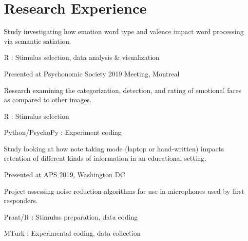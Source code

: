 \documentclass[letterpaper]{deedy-resume_sm} %
\begin{document}
\section{Research Experience}
\begin{tightitemize}
\item Study investigating how emotion word type and valence impact word processing via semantic satiation.
\item R : Stimulus selection, data analysis \& visualization
\item Presented at Psychonomic Society 2019 Meeting, Montreal
\end{tightitemize}
\sectionspace %
\begin{tightitemize}
\item Research examining the categorization, detection, and rating of emotional faces as compared to other images.
\item R : Stimulus selection
\item Python/PsychoPy : Experiment coding
\end{tightitemize}
\sectionspace %
\begin{tightitemize}
\item Study looking at how note taking mode (laptop or hand-written) impacts retention of different kinds of information in an educational setting.
\item Presented at APS 2019, Washington DC
\end{tightitemize}
\sectionspace %
\begin{tightitemize}
\item Project assessing noise reduction algorithms for use in microphones used by first responders.
\item Praat/R : Stimulus preparation, data coding
\item MTurk : Experimental coding, data collection
\end{tightitemize}
\end{document}
